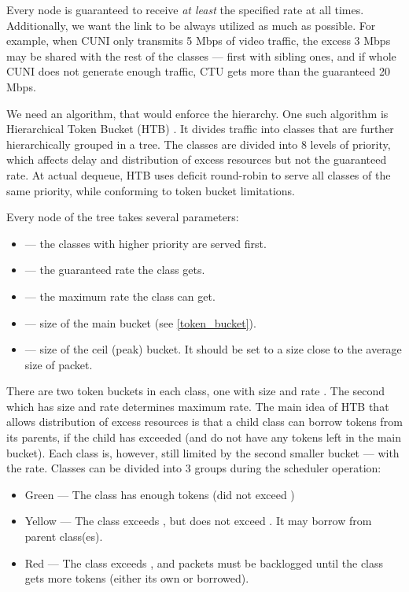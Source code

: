 Every node is guaranteed to receive \textit{at least} the specified rate at all times. Additionally, we want the link to be always utilized as much as possible. For example, when CUNI only transmits 5 Mbps of video traffic, the excess 3 Mbps may be shared with the rest of the classes --- first with sibling ones, and if whole CUNI does not generate enough traffic, CTU gets more than the guaranteed 20 Mbps.


We need an algorithm, that would enforce the hierarchy. One such algorithm is Hierarchical Token Bucket (HTB) \cite{HTB}. It divides traffic into classes that are further hierarchically grouped in a tree. The classes are divided into 8 levels of priority, which affects delay and distribution of excess resources but not the guaranteed rate. At actual dequeue, HTB uses deficit round-robin to serve all classes of the same priority, while conforming to token bucket limitations.

Every node of the tree takes several parameters:
\begin{itemize}
	\item {} --- the classes with higher priority are served first.
	\item {} --- the guaranteed rate the class gets.
	\item {} --- the maximum rate the class can get.
	\item {} --- size of the main bucket (see \ref{token_bucket}).
	\item {} --- size of the ceil (peak) bucket. It should be set to a size close to the average size of packet.
\end{itemize}

There are two token buckets in each class, one with size  and rate . The second which has size  and rate  determines maximum rate. The main idea of HTB that allows distribution of excess resources is that a child class can borrow tokens from its parents, if the child has exceeded  (and do not have any tokens left in the main bucket). Each class is, however, still limited by the second smaller bucket --- with the  rate. Classes can be divided into 3 groups during the scheduler operation:
\begin{itemize}
	\item Green --- The class has enough tokens (did not exceed )
	\item Yellow --- The class exceeds , but does not exceed . It may borrow from parent class(es).
	\item Red --- The class exceeds , and packets must be backlogged until the class gets more tokens (either its own or borrowed).
\end{itemize}


